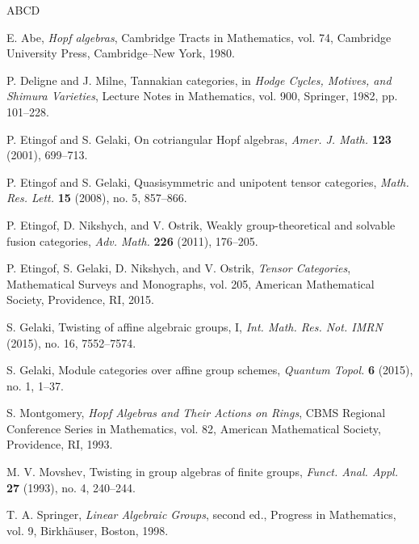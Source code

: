 \documentclass{amsart}
\theoremstyle{definition}
\numberwithin{equation}{section}
\begin{document}
\begin{thebibliography}{ABCD}

E. Abe, \emph{Hopf algebras}, Cambridge Tracts in Mathematics, vol. 74,
Cambridge University Press, Cambridge--New York, 1980.

P. Deligne and J. Milne, Tannakian categories, in \emph{Hodge Cycles, Motives, and
Shimura Varieties}, Lecture Notes in Mathematics, vol. 900, Springer, 1982,
pp. 101--228.

P. Etingof and S. Gelaki, On cotriangular Hopf algebras,
\emph{Amer. J. Math.} \textbf{123} (2001), 699--713.

P. Etingof and S. Gelaki, Quasisymmetric and unipotent tensor categories,
\emph{Math. Res. Lett.} \textbf{15} (2008), no. 5, 857--866.

P. Etingof, D. Nikshych, and V. Ostrik, Weakly group-theoretical and solvable
fusion categories, \emph{Adv. Math.} \textbf{226} (2011), 176--205.

P. Etingof, S. Gelaki, D. Nikshych, and V. Ostrik,
\emph{Tensor Categories}, Mathematical Surveys and Monographs, vol. 205,
American Mathematical Society, Providence, RI, 2015.

S. Gelaki, Twisting of affine algebraic groups, I,
\emph{Int. Math. Res. Not. IMRN} (2015), no. 16, 7552--7574.

S. Gelaki, Module categories over affine group schemes,
\emph{Quantum Topol.} \textbf{6} (2015), no. 1, 1--37.

S. Montgomery, \emph{Hopf Algebras and Their Actions on Rings},
CBMS Regional Conference Series in Mathematics, vol. 82,
American Mathematical Society, Providence, RI, 1993.

M. V. Movshev, Twisting in group algebras of finite groups,
\emph{Funct. Anal. Appl.} \textbf{27} (1993), no. 4, 240--244.

T. A. Springer, \emph{Linear Algebraic Groups}, second ed.,
Progress in Mathematics, vol. 9, Birkh\"auser, Boston, 1998.

\end{thebibliography}
\end{document}
